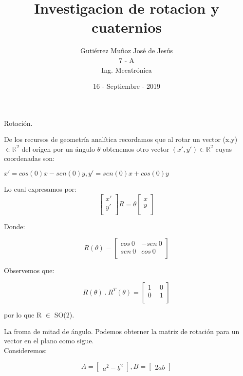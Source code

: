 \documentclass[a4paper,10pt]{article}
\title{Investigacion de rotacion y cuaternios}
\author{Gutiérrez Muñoz José de Jesús \\ 7 - A \\ Ing. Mecatrónica}
\date{16 - Septiembre - 2019}
\begin{document}
\maketitle
\large
Rotación.


De los recursos de geometría analítica recordamos que al rotar un vector (x,y) $\in \mathbb{R}^2$ del origen por un ángulo $\theta$ obtenemos otro vector $({x'},{y'}) \in \mathbb{R}^2$ cuyas coordenadas son:

$x{'}= cos(0)x−sen(0)y, y{'}= sen(0)x+ cos(0)y$

Lo cual expresamos por:
\begin{equation}
\left
[\begin{array}{lcr}
x{'}\\ y{'} \\
\end{array}\right]
R = \theta
\left
[\begin{array}{lcr}
x\\ y \\
\end{array}\right]
\end{equation}

Donde:

\begin{equation}
R ( \theta ) =
\left
[\begin{array}{lcr}
cos \ 0 & -sen \ 0\\ sen \ 0 & cos \ 0\\
\end{array}\right]
\end{equation}

Observemos que:

\begin{equation}
R( \theta ) \ . \ R^T( \theta ) =
\left
[\begin{array}{lcr}
1 \ & \ 0 \\ 0 \ & \ 1 \\
\end{array}\right]
\end{equation}

por lo que R $\in$ SO(2).


La froma de mitad de ángulo. Podemos obterner la matriz de rotación para un vector en el plano como sigue. \\ Consideremos:

\begin{equation}
A = 
\left
[\begin{array}{lcr}
a^2-b^2
\end{array}\right]
,B =
\left
[\begin{array}{lcr}
2ab
\end{array}\right]
\end{equation}
\end{document}
